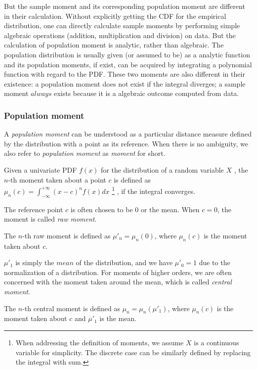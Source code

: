But the sample moment and its corresponding population moment are different in their calculation. Without explicitly getting the CDF for the empirical distribution, one can directly calculate sample moments by performing simple algebraic operations (addition, multiplication and division) on data. But the calculation of population moment is analytic, rather than algebraic. The population distribution is usually given (or assumed to be) as a analytic function and its population moments, if exist, can be acquired by integrating a polynomial function with regard to the PDF. These two moments are also different in their existence: a population moment does not exist if the integral diverges; a sample moment $ always $ exists because it is a algebraic outcome computed from data.

\subsubsection{Population moment}
A \textit{population moment} can be understood as a particular distance measure defined by the distribution with a point as its reference. When there is no ambiguity, we also refer to \textit{population moment} as \textit{moment} for short. 
\begin{defn}
Given a univariate PDF $ f(x) $ for the distribution of a random variable $ X $ , the $ n $-th moment taken about a point $ c $ is defined as $ \mu_n(c) = \int_{-\infty}^{+\infty} (x-c)^n f(x) dx $ \footnote{When addressing the definition of moments, we assume $ X $ is a continuous variable for simplicity. The discrete case can be similarly defined by replacing the integral with sum.} , if the integral converges.   
\end{defn}

The reference point $ c $ is often chosen to be $ 0 $ or the mean. When $ c=0 $, the moment is called \textit{raw moment}.

\begin{defn}
The $ n $-th raw moment is defined as $ \mu'_n = \mu_n(0) $, where $ \mu_n(c) $ is the moment taken about $ c $. 
\end{defn}
    
$ \mu'_1 $ is simply the $ mean $ of the distribution, and we have $ \mu'_0=1 $ due to the normalization of a distribution. For moments of higher orders, we are often concerned with the moment taken around the mean, which is called \textit{central moment}.

\begin{defn}
The $ n $-th central moment is defined as $ \mu_n = \mu_n(\mu'_1) $, where $ \mu_n(c) $ is the moment taken about $ c $ and $ \mu'_1 $ is the mean.    
\end{defn}

